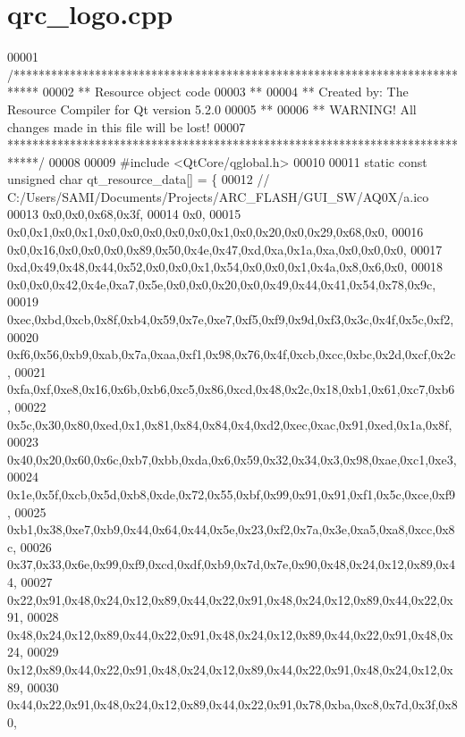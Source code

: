 \hypertarget{a00041_source}{\section{qrc\+\_\+logo.\+cpp}
\label{a00041_source}
}

\begin{DoxyCode}
00001 \textcolor{comment}{/****************************************************************************}
00002 \textcolor{comment}{** Resource object code}
00003 \textcolor{comment}{**}
00004 \textcolor{comment}{** Created by: The Resource Compiler for Qt version 5.2.0}
00005 \textcolor{comment}{**}
00006 \textcolor{comment}{** WARNING! All changes made in this file will be lost!}
00007 \textcolor{comment}{*****************************************************************************/}
00008 
00009 \textcolor{preprocessor}{#include <QtCore/qglobal.h>}
00010 
00011 \textcolor{keyword}{static} \textcolor{keyword}{const} \textcolor{keywordtype}{unsigned} \textcolor{keywordtype}{char} qt\_resource\_data[] = \{
00012   \textcolor{comment}{// C:/Users/SAMI/Documents/Projects/ARC\_FLASH/GUI\_SW/AQ0X/a.ico}
00013   0x0,0x0,0x68,0x3f,
00014   0x0,
00015   0x0,0x1,0x0,0x1,0x0,0x0,0x0,0x0,0x0,0x1,0x0,0x20,0x0,0x29,0x68,0x0,
00016   0x0,0x16,0x0,0x0,0x0,0x89,0x50,0x4e,0x47,0xd,0xa,0x1a,0xa,0x0,0x0,0x0,
00017   0xd,0x49,0x48,0x44,0x52,0x0,0x0,0x1,0x54,0x0,0x0,0x1,0x4a,0x8,0x6,0x0,
00018   0x0,0x0,0x42,0x4e,0xa7,0x5e,0x0,0x0,0x20,0x0,0x49,0x44,0x41,0x54,0x78,0x9c,
00019   0xec,0xbd,0xcb,0x8f,0xb4,0x59,0x7e,0xe7,0xf5,0xf9,0x9d,0xf3,0x3c,0x4f,0x5c,0xf2,
00020   0xf6,0x56,0xb9,0xab,0x7a,0xaa,0xf1,0x98,0x76,0x4f,0xcb,0xcc,0xbc,0x2d,0xcf,0x2c,
00021   0xfa,0xf,0xe8,0x16,0x6b,0xb6,0xc5,0x86,0xcd,0x48,0x2c,0x18,0xb1,0x61,0xc7,0xb6,
00022   0x5c,0x30,0x80,0xed,0x1,0x81,0x84,0x84,0x4,0xd2,0xec,0xac,0x91,0xed,0x1a,0x8f,
00023   0x40,0x20,0x60,0x6c,0xb7,0xbb,0xda,0x6,0x59,0x32,0x34,0x3,0x98,0xae,0xc1,0xe3,
00024   0x1e,0x5f,0xcb,0x5d,0xb8,0xde,0x72,0x55,0xbf,0x99,0x91,0x91,0xf1,0x5c,0xce,0xf9,
00025   0xb1,0x38,0xe7,0xb9,0x44,0x64,0x44,0x5e,0x23,0xf2,0x7a,0x3e,0xa5,0xa8,0xcc,0x8c,
00026   0x37,0x33,0x6e,0x99,0xf9,0xcd,0xdf,0xb9,0x7d,0x7e,0x90,0x48,0x24,0x12,0x89,0x44,
00027   0x22,0x91,0x48,0x24,0x12,0x89,0x44,0x22,0x91,0x48,0x24,0x12,0x89,0x44,0x22,0x91,
00028   0x48,0x24,0x12,0x89,0x44,0x22,0x91,0x48,0x24,0x12,0x89,0x44,0x22,0x91,0x48,0x24,
00029   0x12,0x89,0x44,0x22,0x91,0x48,0x24,0x12,0x89,0x44,0x22,0x91,0x48,0x24,0x12,0x89,
00030   0x44,0x22,0x91,0x48,0x24,0x12,0x89,0x44,0x22,0x91,0x78,0xba,0xc8,0x7d,0x3f,0x80,

\end{DoxyCode}
